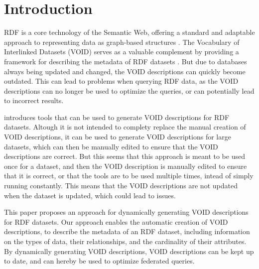 \section{Introduction}\label{sec:introduction}
RDF is a core technology of the Semantic Web, offering a standard and adaptable approach to representing data as graph-based structures \cite{the web of data}. The Vocabulary of Interlinked Datasets (VOID) serves as a valuable complement by providing a framework for describing the metadata of RDF datasets \cite{Cheng og Harting}. But due to databases always being updated and changed, the VOID descriptions can quickly become outdated. This can lead to problems when querying RDF data, as the VOID descriptions can no longer be used to optimize the queries, or can potentially lead to incorrect results.

\cite{Creating VOID descriptions for Web-scale Data} introduces tools that can be used to generate VOID descriptions for RDF datasets. Altough it is not intended to complety replace the manual creation of VOID descriptions, it can be used to generate VOID descriptions for large datasets, which can then be manually edited to ensure that the VOID descriptions are correct. But this seems  that this approach is meant to be used once for a dataset, and then the VOID description is manually edited to ensure that it is correct, or that the tools are to be used multiple times, intead of simply running constantly. This means that the VOID descriptions are not updated when the dataset is updated, which could lead to issues.

This paper proposes an approach for dynamically generating VOID descriptions for RDF datasets. Our approach enables the automatic creation of VOID descriptions, to describe the metadata of an RDF dataset, including information on the types of data, their relationships, and the cardinality of their attributes. By dynamically generating VOID descriptions, VOID descriptions can be kept up to date, and can hereby be used to optimize federated queries. 




